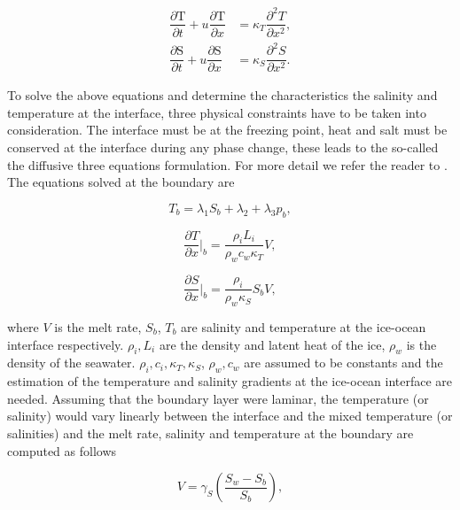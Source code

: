 \documentclass[11pt,a4paper]{article}
\begin{document}
	\begin{eqnarray}
		\label{eq:6}
		\dfrac{\partial\mathrm{T}}{\partial t} +u	\dfrac{\partial\mathrm{T}}{\partial x}& = \kappa_T\dfrac{\partial^2T}{\partial x^2} ,\\[0.3cm] 
		\label{eq:7}
		\dfrac{\partial\mathrm{S}}{\partial t} +u	\dfrac{\partial\mathrm{S}}{\partial x}& = \kappa_S\dfrac{\partial^2S}{\partial x^2} . 
	\end{eqnarray}

	To solve the above equations and determine the characteristics the salinity and temperature at the interface, three physical constraints have to be taken into consideration. The interface must be at the freezing point, heat and salt must be conserved at the interface during any phase change, these leads to the so-called the diffusive three equations formulation. For more detail we refer the reader to \cite{holland1999modeling}. The equations solved at the boundary are 
	
	\begin{equation}
		\label{eq:9}
		T_b = \lambda_1S_b + \lambda_2 + \lambda_3p_b,
	\end{equation} 

	\begin{equation}
		\label{eq:eq10}
		\dfrac{\partial T}{\partial x}\bigg|_b = \dfrac{\rho_iL_i}{\rho_wc_w\kappa_T}V,
	\end{equation}

	\begin{equation}
		\label{eq:eq11}
		\dfrac{\partial S}{\partial x}\bigg|_b = \dfrac{\rho_i}{\rho_w\kappa_S}S_bV,
	\end{equation}
	
	where $V$ is the melt rate, $S_b$, $T_b$ are salinity and temperature at the ice-ocean interface respectively. $\rho_i, L_i$ are the density and latent heat of the ice, $\rho_w$ is the density of the seawater. 
	$\rho_i, c_i, \kappa_T, \kappa_S$, $\rho_w, c_w$ are assumed to be constants and the estimation of the temperature and salinity gradients at the ice-ocean interface are needed. Assuming that the boundary layer were laminar, the temperature (or salinity) would vary linearly between the interface and the mixed temperature (or salinities) and the melt rate, salinity and temperature at the boundary are computed as follows 
	
		\begin{equation}
		\label{eq:12}
		V = \gamma_S\left(\dfrac{S_w-S_b}{S_b}\right),
	\end{equation}
	
\end{document}
